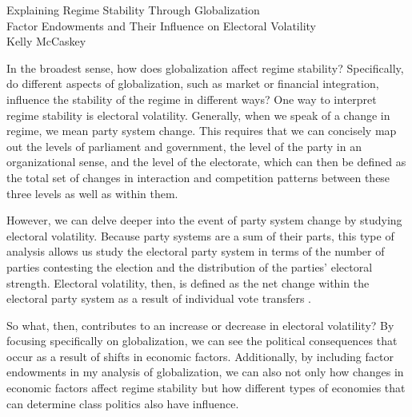 \documentclass[12pt,letterpaper]{article}
\begin{document}
\begin{center}
{\LARGE Explaining Regime Stability Through Globalization}\\\vspace{2mm}
{ \large Factor Endowments and Their Influence on Electoral Volatility}\\
\vspace{10mm}
Kelly McCaskey
\end{center}



\doublespace
In the broadest sense, how does globalization affect regime stability? Specifically, do different aspects of globalization, such as market or financial integration, influence the stability of the regime in different ways? One way to interpret regime stability is electoral volatility. Generally, when we speak of a change in regime, we mean party system change. This requires that we can concisely map out the levels of parliament and government, the level of the party in an organizational sense, and the level of the electorate, which can then be defined as the total set of changes in interaction and competition patterns between these three levels as well as within them. 

However, we can delve deeper into the event of party system change by studying electoral volatility. Because party systems are a sum of their parts, this type of analysis allows us study the electoral party system in terms of the number of parties contesting the election and the distribution of the parties' electoral strength. Electoral volatility, then, is defined as the net change within the electoral party system as a result of individual vote transfers \citep{Pedersen1979}. 

So what, then, contributes to an increase or decrease in electoral volatility? By focusing specifically on globalization, we can see the political consequences that occur as a result of shifts in economic factors. Additionally, by including factor endowments in my analysis of globalization, we can also not only how changes in economic factors affect regime stability but how different types of economies that can determine class politics also have influence.
\end{document}
